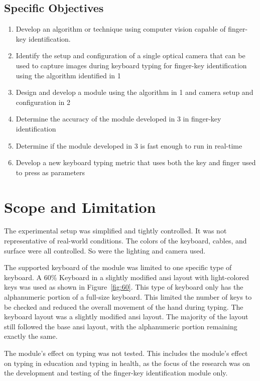 \documentclass{report}
\begin{document}
\subsection{Specific Objectives}
\begin{enumerate}
	\item Develop an algorithm or technique using computer vision capable of
	      finger-key identification.
	\item Identify the setup and configuration of a single optical camera that can
	      be used to capture images during keyboard typing for finger-key
	      identification using the algorithm identified in 1
	\item Design and develop a module using the algorithm in 1 and camera setup
	      and configuration in 2
	\item Determine the accuracy of the module developed in 3 in finger-key
	      identification
	\item Determine if the module developed in 3 is fast enough to run in
	      real-time
	\item Develop a new keyboard typing metric that uses both the key and
	      finger used to press as parameters
\end{enumerate}

\section{Scope and Limitation}
The experimental setup was simplified and tightly controlled. It was not
representative of real-world conditions. The colors of the keyboard, cables, and
surface were all controlled. So were the lighting and camera used.

The supported keyboard of the module was limited to one specific type of
keyboard. A 60\% Keyboard in a slightly modified \ac{ansi} layout with
light-colored keys was used as shown in Figure~\ref{fig:60}. This type of
keyboard only has the alphanumeric portion of a full-size keyboard. This limited
the number of keys to be checked and reduced the overall movement of the hand
during typing. The keyboard layout was a slightly modified \ac{ansi} layout. The
majority of the layout still followed the base \ac{ansi} layout, with the
alphanumeric portion remaining exactly the same.

The module's effect on typing was not tested. This includes the module's effect
on typing in education and typing in health, as the focus of the research was on
the development and testing of the finger-key identification module only.
\end{document}
